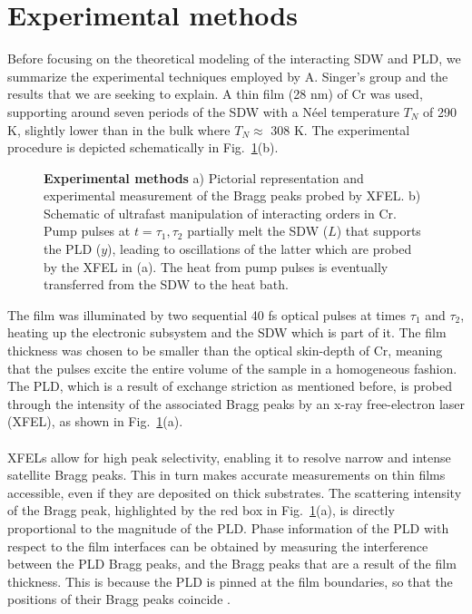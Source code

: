 \section{Experimental methods}
Before focusing on the theoretical modeling of the interacting SDW and PLD, we summarize the experimental techniques employed by A. Singer's group and the results that we are seeking to explain.
A thin film (28 nm) of Cr was used, supporting around seven periods of the SDW with a N\'eel temperature $T_N$ of 290 K, slightly lower than in the bulk where $T_N\approx$ 308 K.
The experimental procedure is depicted schematically in Fig.~\ref{fig:Cr_schematic}(b). 
\begin{figure}[h]
\caption{\label{fig:Cr_schematic}{\bf Experimental methods} a) Pictorial representation and experimental measurement of the Bragg peaks probed by XFEL. b) Schematic of ultrafast manipulation of interacting orders in Cr. Pump pulses at $t=\tau_1,\tau_2$ partially melt the SDW ($L$) that supports the PLD ($y$), leading to oscillations of the latter which are probed by the XFEL in (a). The heat from pump pulses is eventually transferred from the SDW to the heat bath.}
\end{figure}
The film was illuminated by two sequential 40 fs optical pulses at times $\tau_1$ and $\tau_2$, heating up the electronic subsystem and the SDW which is part of it.
The film thickness was chosen to be smaller than the optical skin-depth of Cr, meaning that the pulses excite the entire volume of the sample in a homogeneous fashion.
The PLD, which is a result of exchange striction as mentioned before, is probed through the intensity of the associated Bragg peaks by an x-ray free-electron laser (XFEL)\cite{Singer2015prb, Singer2015prl}, as shown in Fig.~\ref{fig:Cr_schematic}(a).\\\\
XFELs allow for high peak selectivity, enabling it to resolve narrow and intense satellite Bragg peaks.
This in turn makes accurate measurements on thin films accessible, even if they are deposited on thick substrates.
The scattering intensity of the Bragg peak, highlighted by the red box in Fig.~\ref{fig:Cr_schematic}(a), is directly proportional to the magnitude of the PLD.
Phase information of the PLD with respect to the film interfaces can be obtained by measuring the interference between the PLD Bragg peaks, and the Bragg peaks that are a result of the film thickness.
This is because the PLD is pinned at the film boundaries, so that the positions of their Bragg peaks coincide \cite{Singer2015prb}.
